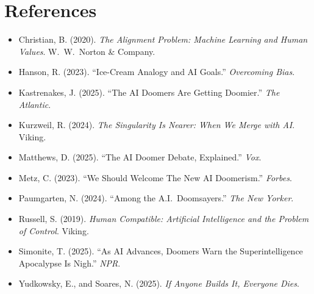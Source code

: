 \documentclass[11pt,a4paper]{article}
\theoremstyle{definition}
\theoremstyle{plain}
\begin{document}
\section*{References}

\begin{itemize}
\item Christian, B. (2020). \textit{The Alignment Problem: Machine Learning and Human Values}. W.\ W.\ Norton \& Company.
\item Hanson, R. (2023). ``Ice-Cream Analogy and AI Goals.'' \textit{Overcoming Bias}.
\item Kastrenakes, J. (2025). ``The AI Doomers Are Getting Doomier.'' \textit{The Atlantic}.
\item Kurzweil, R. (2024). \textit{The Singularity Is Nearer: When We Merge with AI}. Viking.
\item Matthews, D. (2025). ``The AI Doomer Debate, Explained.'' \textit{Vox}.
\item Metz, C. (2023). ``We Should Welcome The New AI Doomerism.'' \textit{Forbes}.
\item Paumgarten, N. (2024). ``Among the A.I.\ Doomsayers.'' \textit{The New Yorker}.
\item Russell, S. (2019). \textit{Human Compatible: Artificial Intelligence and the Problem of Control}. Viking.
\item Simonite, T. (2025). ``As AI Advances, Doomers Warn the Superintelligence Apocalypse Is Nigh.'' \textit{NPR}.
\item Yudkowsky, E., and Soares, N. (2025). \textit{If Anyone Builds It, Everyone Dies}.
\end{itemize}
\end{document}
